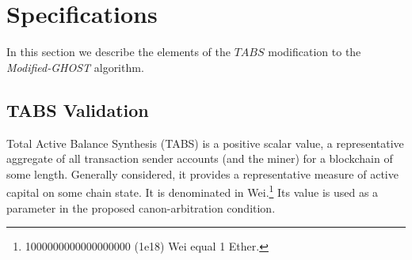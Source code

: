 \documentclass[11pt]{article}
\theoremstyle{plain}
\newcommand{\mghost}{\textit{Modified-GHOST }}
\begin{document}






\pagebreak
\section{\normalsize{Specifications}}\label{sec: specs}

In this section we describe the elements of the $TABS$ modification to the
\mghost algorithm.

\subsection{\small{TABS Validation}}


Total Active Balance Synthesis (TABS) is a positive scalar value,
a representative aggregate of all transaction sender accounts (and the miner) for a blockchain of some length.
Generally considered, it provides a representative measure of active capital on some chain state.
It is denominated in Wei.\footnote{
    1000000000000000000 (1e18) Wei equal 1 Ether. %
}
Its value is used as a parameter in the proposed canon-arbitration condition.
\end{document}
